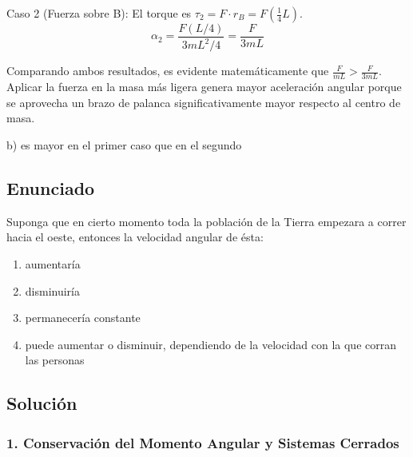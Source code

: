 \documentclass[12pt, a4paper]{article}
\begin{document}
Caso 2 (Fuerza sobre B): El torque es $\tau_2 = F \cdot r_B = F\left(\frac{1}{4}L\right)$.
$$\alpha_2 = \frac{F(L/4)}{3mL^2/4} = \frac{F}{3mL}$$

Comparando ambos resultados, es evidente matemáticamente que $\frac{F}{mL} > \frac{F}{3mL}$. Aplicar la fuerza en la masa más ligera genera mayor aceleración angular porque se aprovecha un brazo de palanca significativamente mayor respecto al centro de masa.

\begin{tcolorbox}[colback=green!5!white, colframe=green!50!black, title=Respuesta Final]
\centering \Large b) es mayor en el primer caso que en el segundo
\end{tcolorbox}

\vspace{1cm}

\subsection*{Enunciado}
Suponga que en cierto momento toda la población de la Tierra empezara a correr hacia el oeste, entonces la velocidad angular de ésta:
\begin{enumerate}[label=\alph*)]
    \item aumentaría
    \item disminuiría
    \item permanecería constante
    \item puede aumentar o disminuir, dependiendo de la velocidad con la que corran las personas
\end{enumerate}

\subsection*{Solución}

\subsubsection*{1. Conservación del Momento Angular y Sistemas Cerrados}
\end{document}
